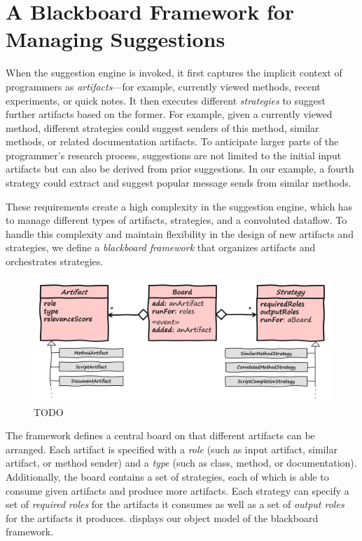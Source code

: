 
\section{A Blackboard Framework for Managing Suggestions}
\label{sec:design/suggestions}

When the suggestion engine is invoked, it first captures the implicit context of programmers as \emph{artifacts}---for example, currently viewed methods, recent experiments, or quick notes.
It then executes different \emph{strategies} to suggest further artifacts based on the former.
For example, given a currently viewed method, different strategies could suggest senders of this method, similar methods, or related documentation artifacts.
To anticipate larger parts of the programmer's research process, suggestions are not limited to the initial input artifacts but can also be derived from prior suggestions.
In our example, a fourth strategy could extract and suggest popular message sends from similar methods. %

These requirements create a high complexity in the suggestion engine, which has to manage different types of artifacts, strategies, and a convoluted dataflow.
To handle this complexity and maintain flexibility in the design of new artifacts and strategies, we define a \emph{blackboard framework} that organizes artifacts and orchestrates strategies.

\begin{figure}
	\centering
	\includegraphics[width=\textwidth]{02_suggestions/classes.png}
	\caption[TODO]{
		TODO
	}
	\label{fig:design/suggestions/classes}
\end{figure}

The framework defines a central board on that different artifacts can be arranged.
Each artifact is specified with a \emph{role} (such as input artifact, similar artifact, or method sender) and a \emph{type} (such as class, method, or documentation).
Additionally, the board contains a set of strategies, each of which is able to consume given artifacts and produce more artifacts.
Each strategy can specify a set of \emph{required roles} for the artifacts it consumes as well as a set of \emph{output roles} for the artifacts it produces.
 displays our object model of the blackboard framework.

